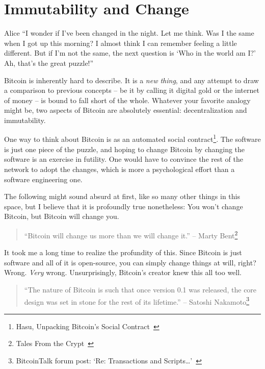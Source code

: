 \chapter{Immutability and Change}
\label{les:1}

\begin{chapquote}{Alice}
\enquote{I wonder if I've been changed in the night. Let me think. Was I the same when I
got up this morning? I almost think I can remember feeling a little different.
But if I'm not the same, the next question is `Who in the world am I?' Ah,
that's the great puzzle!}
\end{chapquote}

Bitcoin is inherently hard to describe. It is a \textit{new thing}, and any
attempt to draw a comparison to previous concepts -- be it by calling
it digital gold or the internet of money -- is bound to fall short of
the whole. Whatever your favorite analogy might be, two aspects of
Bitcoin are absolutely essential: decentralization and immutability.

One way to think about Bitcoin is as an automated social contract\footnote{Hasu,
Unpacking Bitcoin's Social Contract~\cite{social-contract}}. The software is
just one piece of the puzzle, and hoping to change Bitcoin by changing the
software is an exercise in futility. One would have to convince the rest of the
network to adopt the changes, which is more a psychological effort than a
software engineering one.

The following might sound absurd at first, like so many other things in
this space, but I believe that it is profoundly true nonetheless: You
won't change Bitcoin, but Bitcoin will change you.

\begin{samepage}\begin{quotation}
\enquote{Bitcoin will change us more than we will change it.}
\flushright -- Marty Bent\footnote{Tales From the Crypt~\cite{tftc21}}
\end{quotation}\end{samepage}

It took me a long time to realize the profundity of this. Since Bitcoin
is just software and all of it is open-source, you can simply change
things at will, right? Wrong. \textit{Very} wrong. Unsurprisingly, Bitcoin's
creator knew this all too well.

\begin{samepage}\begin{quotation}
\enquote{The nature of Bitcoin is such that once version 0.1 was released, the core
design was set in stone for the rest of its lifetime.}
\flushright -- Satoshi Nakamoto\footnote{BitcoinTalk forum post: `Re:
Transactions and Scripts\ldots'~\cite{satoshi-set-in-stone}}
\end{quotation}\end{samepage}


